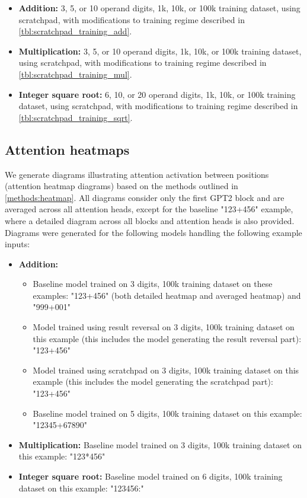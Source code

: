 \begin{itemize}
	\item \textbf{Addition:} 3, 5, or 10 operand digits, 1k, 10k, or 100k training dataset, using scratchpad, with modifications to training regime described in \cref{tbl:scratchpad_training_add}.
	\item \textbf{Multiplication:} 3, 5, or 10 operand digits, 1k, 10k, or 100k training dataset, using scratchpad, with modifications to training regime described in \cref{tbl:scratchpad_training_mul}.
	\item \textbf{Integer square root:} 6, 10, or 20 operand digits, 1k, 10k, or 100k training dataset, using scratchpad, with modifications to training regime described in \cref{tbl:scratchpad_training_sqrt}.
\end{itemize}


\subsection{Attention heatmaps}
\label{setup:heatmap}

We generate diagrams illustrating attention activation between positions (attention heatmap diagrams) based on the methods outlined in \cref{methods:heatmap}. All diagrams consider only the first GPT2 block and are averaged across all attention heads, except for the baseline "123+456" example, where a detailed diagram across all blocks and attention heads is also provided. Diagrams were generated for the following models handling the following example inputs:

\begin{itemize}
	\item \textbf{Addition:} 
	\begin{itemize}
		\item Baseline model trained on 3 digits, 100k training dataset on these examples: "123+456" (both detailed heatmap and averaged heatmap) and "999+001"
		\item Model trained using result reversal on 3 digits, 100k training dataset on this example (this includes the model generating the result reversal part): "123+456" 
		\item Model trained using scratchpad on 3 digits, 100k training dataset on this example (this includes the model generating the scratchpad part): "123+456"
		\item Baseline model trained on 5 digits, 100k training dataset on this example: "12345+67890"
		
	\end{itemize}
	
	\item \textbf{Multiplication:}  Baseline model trained on 3 digits, 100k training dataset on this example: "123*456"
	\item \textbf{Integer square root:}  Baseline model trained on 6 digits, 100k training dataset on this example: "123456:"
\end{itemize}